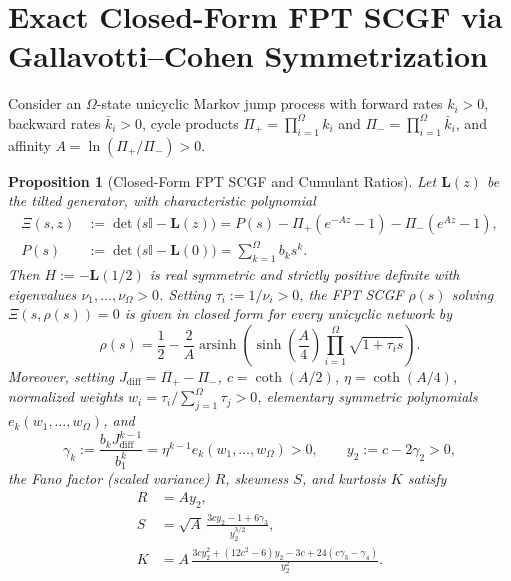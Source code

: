 \documentclass[11pt]{article}
\newtheorem{proposition}[theorem]{Proposition}
\theoremstyle{definition}
\theoremstyle{remark}
\DeclareMathOperator{\arsinh}{arsinh}
\begin{document}
\section{Exact Closed-Form FPT SCGF via Gallavotti--Cohen Symmetrization}

Consider an $\Omega$-state unicyclic Markov jump process with forward rates $k_i > 0$, backward rates $\bar{k}_i > 0$, cycle products $\Pi_+ = \prod_{i=1}^\Omega k_i$ and $\Pi_- = \prod_{i=1}^\Omega \bar{k}_i$, and affinity $A = \ln(\Pi_+/\Pi_-) > 0$.

\begin{proposition}[Closed-Form FPT SCGF and Cumulant Ratios]\label{prop:scgf}
Let $\mathbf{L}(z)$ be the tilted generator, with characteristic polynomial
\begin{align*}
  \Xi(s, z) &:= \det\bigl(s\mathbb{I} - \mathbf{L}(z)\bigr) = P(s) - \Pi_+(e^{-Az} - 1) - \Pi_-(e^{Az} - 1), \\
  P(s) &:= \det\bigl(s\mathbb{I} - \mathbf{L}(0)\bigr) = \sum_{k=1}^\Omega b_k s^k.
\end{align*}
Then $H := -\mathbf{L}(1/2)$ is real symmetric and strictly positive definite with eigenvalues $\nu_1, \dots, \nu_\Omega > 0$. Setting $\tau_i := 1/\nu_i > 0$, the FPT SCGF $\rho(s)$ solving $\Xi(s, \rho(s)) = 0$ is given in closed form for every unicyclic network by
\begin{equation}\label{eq:scgf}
  \rho(s) = \frac{1}{2} - \frac{2}{A}\arsinh\!\left(\sinh\!\left(\frac{A}{4}\right)\prod_{i=1}^\Omega \sqrt{1 + \tau_i s}\right).
\end{equation}
Moreover, setting $J_{\mathrm{diff}} = \Pi_+ - \Pi_-$, $c = \coth(A/2)$, $\eta = \coth(A/4)$, normalized weights $w_i = \tau_i / \sum_{j=1}^\Omega \tau_j > 0$, elementary symmetric polynomials $e_k(w_1,\dots,w_\Omega)$, and
\[
  \gamma_k := \frac{b_k J_{\mathrm{diff}}^{k-1}}{b_1^k} = \eta^{k-1} e_k(w_1, \dots, w_\Omega) > 0,
  \qquad y_2 := c - 2\gamma_2 > 0,
\]
the Fano factor (scaled variance) $R$, skewness $S$, and kurtosis $K$ satisfy
\begin{align}
  R &= A y_2, \label{eq:R} \\
  S &= \sqrt{A}\,\frac{3c y_2 - 1 + 6\gamma_3}{y_2^{3/2}}, \label{eq:S} \\
  K &= A\,\frac{3c y_2^2 + (12c^2 - 6)y_2 - 3c + 24(c\gamma_3 - \gamma_4)}{y_2^2}. \label{eq:K}
\end{align}
\end{proposition}
\end{document}
